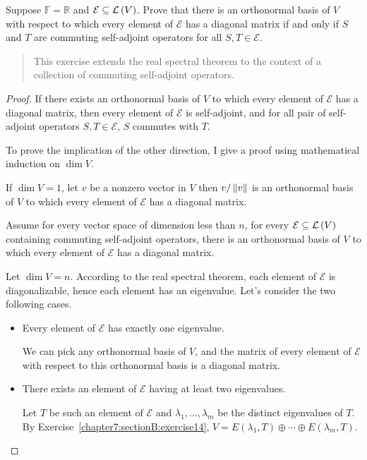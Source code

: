 \begin{exercise}\label{chapter7:sectionB:exercise17}
    Suppose $\mathbb{F} = \mathbb{R}$ and $\mathcal{E} \subseteq \mathcal{L}\left({V}\right)$. Prove that there is an orthonormal basis of $V$ with respect to which every element of $\mathcal{E}$ has a diagonal matrix if and only if $S$ and $T$ are commuting self-adjoint operators for all $S, T \in \mathcal{E}$.
\end{exercise}

\begin{quote}
    This exercise extends the real spectral theorem to the context of a collection
    of commuting self-adjoint operators.
\end{quote}

\begin{proof}
    If there exists an orthonormal basis of $V$ to which every element of $\mathcal{E}$ has a diagonal matrix, then every element of $\mathcal{E}$ is self-adjoint, and for all pair of self-adjoint operators $S, T\in\mathcal{E}$, $S$ commutes with $T$.

    To prove the implication of the other direction, I give a proof using mathematical induction on $\dim V$.

    If $\dim V = 1$, let $v$ be a nonzero vector in $V$ then $v/\left\Vert{v}\right\Vert$ is an orthonormal basis of $V$ to which every element of $\mathcal{E}$ has a diagonal matrix.

    Assume for every vector space of dimension less than $n$, for every $\mathcal{E}\subseteq\mathcal{L}\left({V}\right)$ containing commuting self-adjoint operators, there is an orthonormal basis of $V$ to which every element of $\mathcal{E}$ has a diagonal matrix.

    Let $\dim V = n$. According to the real spectral theorem, each element of $\mathcal{E}$ is diagonalizable, hence each element has an eigenvalue. Let's consider the two following cases.
    \begin{itemize}
        \item Every element of $\mathcal{E}$ has exactly one eigenvalue.

              We can pick any orthonormal basis of $V$, and the matrix of every element of $\mathcal{E}$ with respect to this orthonormal basis is a diagonal matrix.
        \item There exists an element of $\mathcal{E}$ having at least two eigenvalues.

              Let $T$ be such an element of $\mathcal{E}$ and $\lambda_{1}, \ldots, \lambda_{m}$ be the distinct eigenvalues of $T$. By Exercise~\ref{chapter7:sectionB:exercise14}, $V = E(\lambda_{1}, T)\oplus \cdots \oplus E(\lambda_{m}, T)$.


\end{itemize}
\end{proof}
